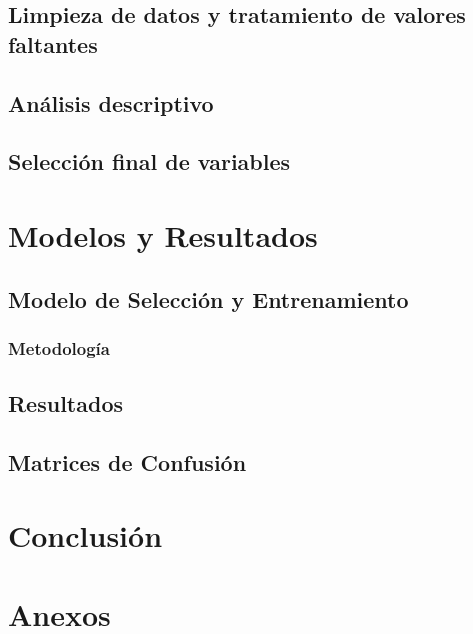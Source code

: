\documentclass[12pt,a4paper,onecolumn]{article}
\begin{document}
\subsection{Limpieza de datos y tratamiento de valores faltantes}

\subsection{Análisis descriptivo}

\subsection{Selección final de variables}

\section{Modelos y Resultados}

\subsection{Modelo de Selección y Entrenamiento}

\subsubsection{Metodología}

\subsection{Resultados}

\subsection{Matrices de Confusión}

\section{Conclusión}


\clearpage
\appendix
\section*{Anexos}

%
\end{document}

